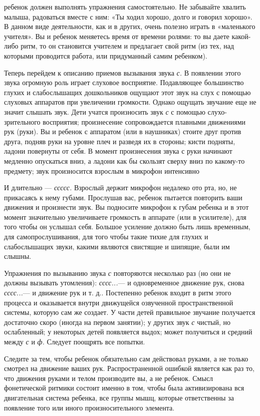 \documentclass{book}
\renewcommand{\emph}[1]{\textit{#1}}
\begin{document}
ребенок должен выполнять упражнения самостоятельно. Не забывайте хвалить
малыша, радоваться вместе с ним: «Ты ходил хорошо, долго и говорил
хорошо». В данном виде деятельности, как и в других, очень полезно
играть в «маленького учителя». Вы и ребенок меняетесь время от времени
ролями: то вы даете какой-либо ритм, то он становится учителем и
предлагает свой ритм (из тех, над которыми проводится работа, или
придуманный самим ребенком).

Теперь перейдем к описанию приемов вызывания звука \emph{с.} В появлении
этого звука огромную роль играет слуховое восприятие. Подавляющее
большинство глухих и слабослышащих дошкольников ощущают этот звук на
слух с помощью слуховых аппаратов при увеличении громкости. Однако
ощущать звучание еще не значит слышать звук. Дети учатся произносить
звук \emph{с} с помощью слухо-зрительного восприятия; произнесение
сопровождается плавными движениями рук (руки). Вы и ребенок с аппаратом
(или в наушниках) стоите друг против друга, подняв руки на уровне плеч и
разведя их в стороны; кисти подняты, ладони повернуты от себя. В момент
произнесения звука с руки начинают медленно опускаться вниз, а ладони
как бы скользят сверху вниз по какому-то предмету; звук произносится
взрослым в микрофон интенсивно

И длительно --- \emph{ссссс.} Взрослый держит микрофон недалеко ото рта,
но, не прикасаясь к нему губами. Прослушав вас, ребенок пытается
повторить ваши движения и произнести звук. Вы подносите микрофон к губам
ребенка и в этот момент значительно увеличиваете громкость в аппарате
(или в усилителе), для того чтобы он услышал себя. Большое усиление
должно быть лишь временным, для самопрослушивания, для того чтобы такие
тихие для глухих и слабослышащих звуки, какими являются свистящие и
шипящие, были им слышны.

Упражнения по вызыванию звука \emph{с} повторяются несколько раз (но они
не должны вызывать утомления): \emph{сссс...}--- и одновременное
движение рук, снова \emph{сссс...}--- и движение рук и т. д.. Постепенно
ребенок входит в ритм этого процесса и оказывается внутри движущейся
озвученной пространственной системы, которую сам же создает. У части
детей правильное звучание получается достаточно скоро (иногда на первом
занятии); у других звук \emph{с} чистый, но ослабленный; у некоторых
детей появляется выдох; может получиться и средний между \emph{с} и
\emph{ф.} Следует поощрять все попытки.

Следите за тем, чтобы ребенок обязательно сам действовал руками, а не
только смотрел на движение ваших рук. Распространенной ошибкой является
как раз то, что движения руками и телом производите вы, а не ребенок.
Смысл фонетической ритмики состоит именно в том, чтобы была
активизирована вся двигательная система ребенка, все группы мышц,
которые ответственны за появление того или иного произносительного
элемента.
\end{document}
